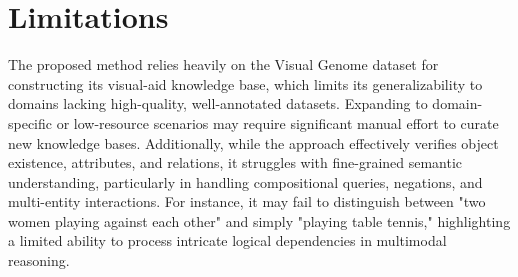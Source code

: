 \section*{Limitations}

The proposed method relies heavily on the Visual Genome dataset for constructing its visual-aid knowledge base, which limits its generalizability to domains lacking high-quality, well-annotated datasets. Expanding to domain-specific or low-resource scenarios may require significant manual effort to curate new knowledge bases. Additionally, while the approach effectively verifies object existence, attributes, and relations, it struggles with fine-grained semantic understanding, particularly in handling compositional queries, negations, and multi-entity interactions. For instance, it may fail to distinguish between "two women playing against each other" and simply "playing table tennis," highlighting a limited ability to process intricate logical dependencies in multimodal reasoning.